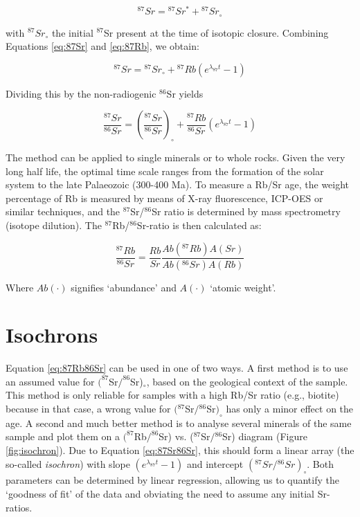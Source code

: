 \begin{equation}
^{87}Sr = {}^{87}Sr^* + {}^{87}Sr_\circ
\label{eq:87Sr}
\end{equation}

with $^{87}Sr_\circ$ the initial $^{87}$Sr present at the time of
isotopic closure.  Combining Equations \ref{eq:87Sr} and
\ref{eq:87Rb}, we obtain:

\begin{equation}
^{87}Sr = {}^{87}Sr_\circ + {}^{87}Rb (e^{\lambda_{87} t} - 1)
\label{eq:87Sr2}
\end{equation}

Dividing this by the non-radiogenic $^{86}$Sr yields

\begin{equation}
\frac{^{87}Sr}{^{86}Sr} =
\left(\frac{^{87}Sr}{^{86}Sr}\right)_\circ +
\frac{^{87}Rb}{^{86}Sr} (e^{\lambda_{87} t} - 1)
\label{eq:87Sr86Sr}
\end{equation}

The method can be applied to single minerals or to whole rocks.  Given
the very long half life, the optimal time scale ranges from the
formation of the solar system to the late Palaeozoic (300-400 Ma).  To
measure a Rb/Sr age, the weight percentage of Rb is measured by means
of X-ray fluorescence, ICP-OES or similar techniques, and the
$^{87}$Sr/$^{86}$Sr ratio is determined by mass spectrometry (isotope
dilution). The $^{87}$Rb/$^{86}$Sr-ratio is then calculated as:

\begin{equation}
\frac{^{87}Rb}{^{86}Sr} =
\frac{Rb}{Sr} \frac{Ab(^{87}Rb)
  A(Sr)}{Ab(^{86}Sr) A(Rb)}
\label{eq:87Rb86Sr}
\end{equation}

Where $Ab(\cdot)$ signifies `abundance' and $A(\cdot)$ `atomic weight'.

\section{Isochrons}
\label{sec:isochrons}

Equation \ref{eq:87Rb86Sr} can be used in one of two ways. A first
method is to use an assumed value for $(^{87}$Sr$/^{86}$Sr)$_\circ$,
based on the geological context of the sample. This method is only
reliable for samples with a high Rb/Sr ratio (e.g., biotite) because
in that case, a wrong value for $({}^{87}$Sr$/{}^{86}$Sr$)_\circ$ has
only a minor effect on the age. A second and much better method is to
analyse several minerals of the same sample and plot them on a
$(^{87}$Rb$/^{86}$Sr) vs.  (${}^{87}$Sr$/{}^{86}$Sr) diagram (Figure
\ref{fig:isochron}).  Due to Equation \ref{eq:87Sr86Sr}, this should
form a linear array (the so-called \emph{isochron}) with slope
$(e^{\lambda_{87} t} - 1)$ and intercept
$({}^{87}Sr/{}^{86}Sr)_\circ$.  Both parameters can be determined
by linear regression, allowing us to quantify the `goodness of fit' of
the data and obviating the need to assume any initial Sr-ratios.


